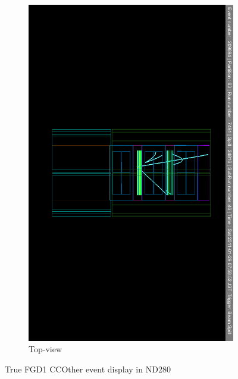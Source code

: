 \begin{itemize}
\begin{figure}[h]
\begin{subfigure}[t]{0.49\textwidth}
			\includegraphics[width=\textwidth, trim={3cm 16cm 3cm 16cm}, clip]{figures/numu/evtdisplay/CCOthers_7491_46_209894_ortX0Z_all}
			\caption{Top-view}
		\end{subfigure}
		\caption{True FGD1 CCOther event display in ND280}
		\label{fig:ccoth_evtdisplay}
	\end{figure}
\end{itemize}


